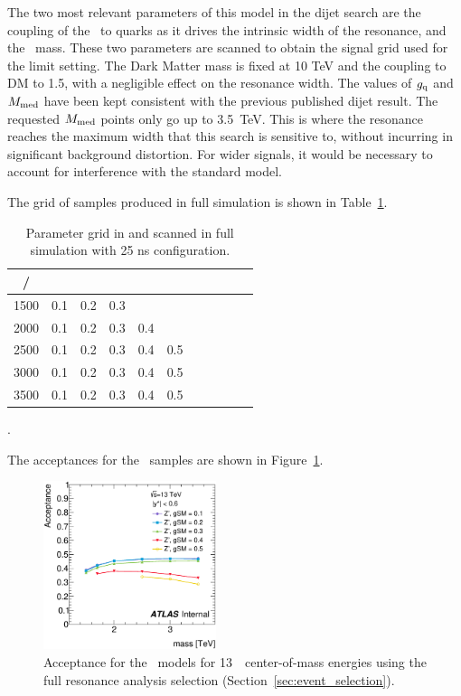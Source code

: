The two most relevant parameters of this model in the dijet search are the coupling of the \Zprime\ to quarks
as it drives the intrinsic width of the resonance, and the \Zprime\ mass. 
These two parameters are scanned to obtain the signal grid used
for the limit setting. The Dark Matter mass is fixed at 10 TeV and the coupling to DM to 1.5, with 
a negligible effect on the resonance width. 
% 
The values of $g_{\mathrm q}$ and $M_{\mathrm{med}}$ have been kept consistent with the previous published dijet result.
The requested $M_{\mathrm{med}}$ points only go up to 3.5~TeV. This is where the resonance reaches the maximum width
that this search is sensitive to, without incurring in significant background distortion. 
For wider signals, it would be necessary to account for interference with the standard model.

The grid of samples produced in full simulation is shown in Table~\ref{tab:ZPrimeScan}.

\begin{table}[!h]
	\centering
		\begin{tabular}{| l |r r r r r r r r r r|}
			\hline
			\multicolumn{1}{|c|}{\mMed/\gev} & \multicolumn{10}{c|}{\gq} \\
			\hline
			1500   	       &         0.1  & 0.2 & 0.3 &  &  &  &  &  &  &  \\
			2000           &         0.1  & 0.2 & 0.3 & 0.4  &  &  &  &  &  &  \\
			2500           &         0.1  & 0.2 & 0.3 & 0.4 & 0.5 &  &  &  &  &  \\
			3000           &         0.1  & 0.2 & 0.3 & 0.4 & 0.5 &  &  &  &  &  \\
			3500           &         0.1  & 0.2 & 0.3 & 0.4 & 0.5 &  &  &  &  &  \\
			\hline
		\end{tabular}
	\caption{Parameter grid in \gq and \mMed scanned in full simulation with 25 ns configuration.}.
	\label{tab:ZPrimeScan}
\end{table}
 
 The acceptances %
 for the \Zprime\ samples
 are shown in Figure~\ref{fig:zprime_acc}.%

 \begin{figure}[!htb]
   \centering
   \includegraphics[width=0.45\textwidth]{figures/benchmark_signals/Acceptances_AllZPrime.eps}
   \caption{Acceptance for the \Zprime\ models 
   for 13~\TeV~center-of-mass energies using the full resonance
   analysis selection (Section~\ref{sec:event_selection}).
   \label{fig:zprime_acc}}
 \end{figure}
 
